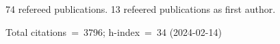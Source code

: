 74 refereed publications. 13 refeered publications as first author.

Total citations~=~3796; h-index~=~34 (2024-02-14)